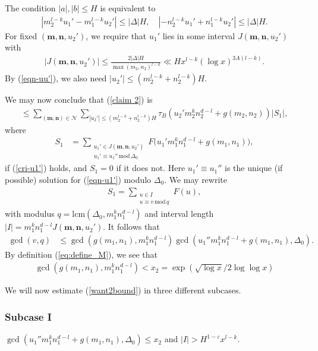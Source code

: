 \documentclass[reqno, 11pt]{amsart}
\renewcommand{\leq}{\leqslant}
\theoremstyle{definition}
\theoremstyle{definition}
\renewcommand{\leq}{\leqslant}
\renewcommand{\mod}{\mathrm{mod}\,}
\newcommand{\lcm}{\mathrm{lcm}}
\newcommand{\eps}{\varepsilon}
\newcommand{\mm}{\mathbf{m}}
\newcommand{\nn}{\mathbf{n}}
\numberwithin{equation}{section}
\begin{document}
The condition $|a|, |b| \leq H$ is equivalent to
\begin{align*}
   |m_2^{l-k}u_1' - m_1^{l-k}u_2'| \leq |\Delta| H, \quad |-n_2^{l-k}u_1' + n_1^{l-k}u_2'| \leq |\Delta| H.
\end{align*}
For fixed $(\mm, \nn, u_2')$, we require that $u_1'$ lies in some interval $J(\mm,\nn, u_2')$ with
\begin{align}\label{est-J}
    |J(\mm,\nn, u_2')| \leq \frac{2 |\Delta| H}{\max (m_2, n_2)^{l-k}} \ll H x^{l-k}(\log x)^{3A(l-k)} .
\end{align}
By (\ref{eqn-uu'}), we also need $|u_2'| \leq (m_2^{l-k} + n_2^{l-k})H$.

We may now conclude that (\ref{claim 2}) is 
\begin{align}\label{want2bound}
    \leq \sum_{(\mm,\nn) \in \mathcal{N}} \sum_{|u_2'| \leq (m_2^{l-k} + n_2^{l-k}) H} \tau_B( u_2' m_2^k n_2^{d-l} + g(m_2,n_2)) | S_1 |,
\end{align}
where
\begin{align*}
    S_1 & = \sum_{\substack{u_1' \in J(\mm,\nn,u_2') \\ u_1' \equiv u_1'' \, \mod \Delta_0}} F\big(u_1' m_1^k n_1^{d-l} + g(m_1, n_1)\big),
\end{align*}
if (\ref{cri-u1'}) holds, and $S_1 = 0$ if it does not. Here $u_1' \equiv u_1''$ is the unique (if possible) solution for (\ref{eqn-u1'}) modulo $\Delta_0$.
We may rewrite
\begin{align*}
    S_1 = \sum_{\substack{u \in I \\ u \equiv v \, \mod q}} F(u),
\end{align*}
with modulus $q = \lcm(\Delta_0, m_1^k n_1^{d-l})$ and interval length
$|I| = m_1^k n_1^{d-l} J(\mm,\nn, u_2')$.
It follows that
\begin{align}\label{x_1=x_2^2}
    \gcd(v, q) & \leq \gcd(g(m_1,n_1), m_1^k n_1^{d-l}) \gcd(u_1'' m_1^k n_1^{d-l} + g(m_1,n_1), \Delta_0).
\end{align}
By definition (\ref{eq:define_M}), we see that
\begin{align}\label{2x_2}
    \gcd(g(m_1,n_1), m_1^k n_1^{d-l}) < x_2 = \exp(\sqrt{\log x}/2\log\log x)
\end{align}

We will now estimate (\ref{want2bound}) in three different subcases.



\subsubsection*{Subcase I}
 $\gcd(u_1'' m_1^k n_1^{d-l} + g(m_1,n_1), \Delta_0) \leq x_2$ and $|I| > H^{1 - \eps}x^{l-k}$. 
\end{document}
